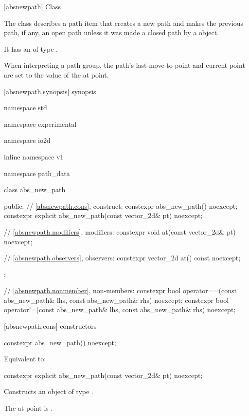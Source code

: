  [absnewpath] {Class }%

\pnum
{}%
The class  describes a path item that creates a new path and makes the previous path, if any, an open path unless it was made a closed path by a  object.

\pnum
It has an  of type .

\pnum
When interpreting a path group, the path's last-move-to-point and current point are set to the value of the at point.

 [absnewpath.synopsis] { synopsis}%

\begin{codeblock}
namespace std { namespace experimental { namespace io2d { inline namespace v1 {
  namespace path_data {
    class abs_new_path {
    public:
      // \ref{absnewpath.cons}, construct:
      constexpr abs_new_path() noexcept;
      constexpr explicit abs_new_path(const vector_2d& pt) noexcept;

      // \ref{absnewpath.modifiers}, modifiers:
      constexpr void at(const vector_2d& pt) noexcept;

      // \ref{absnewpath.observers}, observers:
      constexpr vector_2d at() const noexcept;
    };
    
    // \ref{absnewpath.nonmember}, non-members:
    constexpr bool operator==(const abs_new_path& lhs, const abs_new_path& rhs) 
      noexcept;
    constexpr bool operator!=(const abs_new_path& lhs, const abs_new_path& rhs) 
      noexcept;
  }
} } } }
\end{codeblock}

 [absnewpath.cons] { constructors}%

%
\begin{itemdecl}
constexpr abs_new_path() noexcept;
\end{itemdecl}
\begin{itemdescr}
\pnum
\effects
Equivalent to: 
\end{itemdescr}

%
\begin{itemdecl}
constexpr explicit abs_new_path(const vector_2d& pt) noexcept;
\end{itemdecl}
\begin{itemdescr}
\pnum
\effects
Constructs an object of type .

\pnum
The at point is .
\end{itemdescr}

